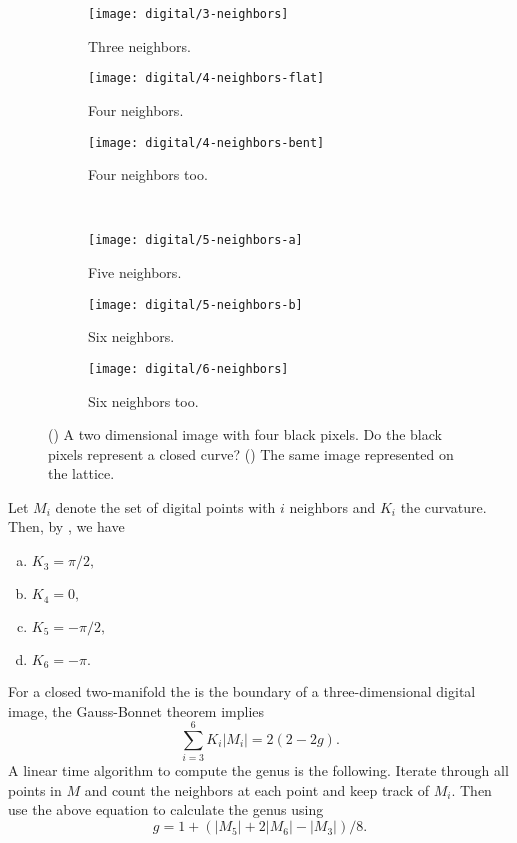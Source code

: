 \begin{figure}[htb]
        \centering
        \begin{subfigure}[b]{0.2\textwidth}
        \texttt{[image: digital/3-neighbors]}
        \caption{Three neighbors.}
          \label{fig:3-neighbors}
        \end{subfigure}
          \hspace{.3cm}
         \begin{subfigure}[b]{0.25\textwidth}
        \texttt{[image: digital/4-neighbors-flat]}
        \caption{Four neighbors.}
        \label{fig:4-neighbors-flat}
        \end{subfigure}
         \hspace{.3cm}
         \begin{subfigure}[b]{0.2\textwidth}
        \texttt{[image: digital/4-neighbors-bent]}
        \caption{Four neighbors too.}
        \label{fig:4-neighbors-bent}
        \end{subfigure}\\
         \begin{subfigure}[b]{0.25\textwidth}
        \texttt{[image: digital/5-neighbors-a]}
        \caption{Five neighbors.}
          \label{fig:1-neighbors}
        \end{subfigure}
          \hspace{.2cm}
         \begin{subfigure}[b]{0.25\textwidth}
        \texttt{[image: digital/5-neighbors-b]}
        \caption{Six neighbors.}
        \label{fig:4-neighbors-flat}
        \end{subfigure}
         \hspace{.2cm}
         \begin{subfigure}[b]{0.25\textwidth}
        \texttt{[image: digital/6-neighbors]}
        \caption{Six neighbors too.}
        \label{fig:6-neighbors}
        \end{subfigure}
		\caption{() A two dimensional image with four black pixels.
		Do the black pixels represent a closed curve? () The same image
		represented on the lattice.
		\label{fig:4-square-and-dual}}
\end{figure}

Let $M_i$ denote the set of digital points with $i$ neighbors and $K_i$
the curvature.
Then, by , we have
\begin{enumerate}[(a)]
\item $K_3=\pi/2,$
\item $K_4=0,$
\item $K_5=-\pi/2,$
\item $K_6=-\pi.$
\end{enumerate}

For a closed two-manifold the is the boundary of a three-dimensional
digital image, the Gauss-Bonnet theorem implies
$$\sum_{i=3}^6K_i |M_i|=2(2-2g).$$
A linear time algorithm to compute the genus is the following.
Iterate through all points in $M$ and count the neighbors at each point
and keep track of $M_i$. Then use the above equation to  calculate the genus
using 
$$g=1+(|M_5|+2|M_6|-|M_3|)/8.$$